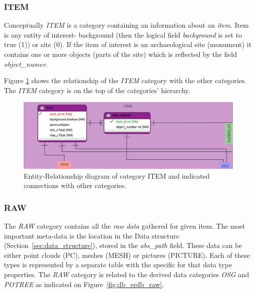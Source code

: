 \subsubsection{ITEM}
Conceptually {\em ITEM} is a category containing an information about an {\em item}.
Item is any entity of interest- background (then the logical field {\em background} is
set to true (1)) or site (0). If the item of interest is an archaeological site (monument)
it contains one or more objects (parts of the site) which is reflected by the field
{\em object\_numer}. 

Figure \ref{fig:db_erdb_item} shows the relationship of the {\em ITEM} category with
the other categories. The {\em ITEM} category is on the top of the categories' hierarchy.

\begin{figure}[H]
\centering
\includegraphics[scale=0.35]{fig/database/ERDB_ITEM_conn.pdf}
\caption{Entity-Relationship diagram of category ITEM and indicated connections
with other categories.}
\label{fig:db_erdb_item}
\end{figure}

\subsubsection{RAW}
The {\em RAW} category contains all the \textit{raw data} gathered for given item.
The most important meta-data is the location in the Data structure (Section~\ref{sec:data_structure}),
stored in the {\em abs\_path} field. These data can be either point clouds (PC),
meshes (MESH) or pictures (PICTURE). Each of these types is represented by a separate
table with the specific for that data type properties. The {\em RAW} category is
related to the derived data categories {\em OSG} and {\em POTREE} as indicated on
Figure~\ref{fig:db_erdb_raw}.

